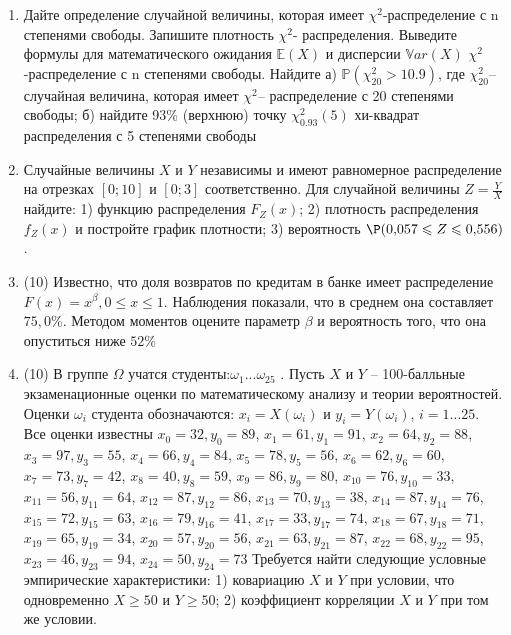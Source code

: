 \documentclass[a4paper,11pt]{article}
\begin{document}
\begin{enumerate}


\item


Дайте определение случайной величины, которая имеет $\chi ^{2}$-распределение с n степенями свободы.
Запишите плотность $\chi ^{2}$- распределения. Выведите формулы для математического ожидания $\mathbb{E}(X)$ и дисперсии $\mathbb{V}ar(X)$ $\chi ^{2}$-распределение с n степенями свободы. Найдите а) $\mathbb{P}(\chi _{20}^{2} > 10.9)$, где $\chi _{20}^{2}$–случайная величина, которая имеет $\chi ^{2}$– распределение с 20 степенями свободы; б) найдите 93\%
(верхнюю) точку $\chi _{0.93}^{2} (5)$ хи-квадрат распределения с 5 степенями свободы


\item

Случайные величины $X$ и $Y$ независимы и имеют равномерное
распределение на отрезках $[0;10]$ и $[0;3]$ соответственно. Для случайной величины $Z=\frac{Y}{X}$ найдите: 
1) функцию распределения $F_Z(x)$;
2) плотность распределения $f_Z(x)$ и постройте график плотности;
3) вероятность $\P(0,\!057\leqslant Z\leqslant 0,\!556)$.


\item


(10) Известно, что доля возвратов по кредитам в банке имеет распределение $F(x) = x ^{\beta}, 0 \leqslant x \leqslant 1$.
Наблюдения показали, что в среднем она составляет $75,0\%$. Методом моментов оцените параметр $\beta$ и
вероятность того, что она опуститься ниже $52\%$


\item


(10) В группе $\Omega$ учатся студенты:$\omega _{1}...\omega _{25}$ . Пусть $X$ и $Y$ – 100-балльные экзаменационные оценки по
математическому анализу и теории вероятностей. Оценки $\omega _{i}$ студента обозначаются: $x _{i} = X(\omega _{i})$ и $y _{i} = Y(\omega _{i})$, $i = 1...25$. Все оценки известны
$x _{0} = 32, y _{0} = 89$, $x _{1} = 61, y _{1} = 91$, $x _{2} = 64, y _{2} = 88$, $x _{3} = 97, y _{3} = 55$, $x _{4} = 66, y _{4} = 84$, $x _{5} = 78, y _{5} = 56$, $x _{6} = 62, y _{6} = 60$, $x _{7} = 73, y _{7} = 42$, $x _{8} = 40, y _{8} = 59$, $x _{9} = 86, y _{9} = 80$, $x _{10} = 76, y _{10} = 33$, $x _{11} = 56, y _{11} = 64$, $x _{12} = 87, y _{12} = 86$, $x _{13} = 70, y _{13} = 38$, $x _{14} = 87, y _{14} = 76$, $x _{15} = 72, y _{15} = 63$, $x _{16} = 79, y _{16} = 41$, $x _{17} = 33, y _{17} = 74$, $x _{18} = 67, y _{18} = 71$, $x _{19} = 65, y _{19} = 34$, $x _{20} = 57, y _{20} = 56$, $x _{21} = 63, y _{21} = 87$, $x _{22} = 68, y _{22} = 95$, $x _{23} = 46, y _{23} = 94$, $x _{24} = 50, y _{24} = 73$
Требуется
найти следующие условные эмпирические характеристики: 1) ковариацию $X$ и $Y$ при условии, что одновременно $X \geqslant 50$
 и $Y \geqslant 50$; 2) коэффициент корреляции $X$ и $Y$ при том же условии.



\end{enumerate}
\end{document}
